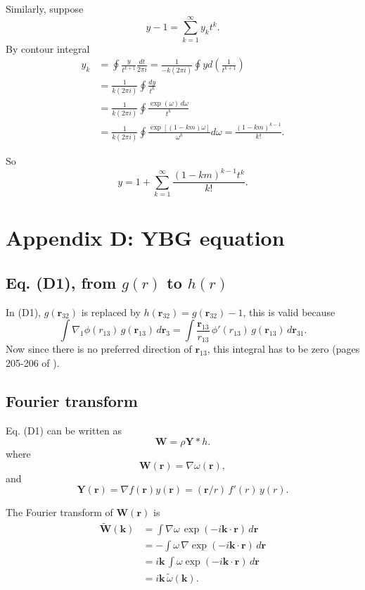 \documentclass[preprint]{revtex4-1}
\numberwithin{equation}{subsection}
\numberwithin{table}{section}
\newcommand{\vct}[1]{\mathbf{#1}}
\providecommand{\vr}{} %
\renewcommand{\vr}{\vct{r}}
\newcommand{\vk}{\vct{k}}
\begin{document}
Similarly, suppose
\[
  y - 1
=
\sum_{k = 1}^\infty y_k t^k.
\]
By contour integral
\begin{align*}
y_k
&=
\oint \frac{y}{t^{k+1}} \frac{dt}{2\pi i}
=
\frac{1}{-k (2\pi i)} \oint y d\left(\frac{1}{t^{k+1}}\right)
\\
&=
\frac{1}{k (2\pi i)} \oint \frac{ dy }{t^{k}}
\\
&=
\frac{1}{k (2\pi i)} \oint \frac{ \exp(\omega) \, d\omega }{t^{k}}
\\
&=
\frac{1}{k (2\pi i)} \oint \frac{ \exp[(1 - k m) \omega]  }{\omega^{k}} d\omega
=
\frac{ (1-k m)^{k-1} }
     { k! }.
\end{align*}

So
\[
  y
=
1 + \sum_{k = 1}^\infty
\frac{ (1 - k m)^{k-1} t^k } { k! }.
\]



\section{Appendix D: YBG equation}

\subsection{Eq. (D1), from $g(r)$ to $h(r)$}

In (D1), $g(\vr_{32})$ is replaced by $h(\vr_{32}) = g(\vr_{32}) - 1$,
this is valid because
\[
  \int \nabla_1 \phi(r_{13}) \, g(\vr_{13}) \, d\vr_3
=
  \int \frac{ \vr_{13} } { r_{13} } \,
  \phi'(r_{13}) \, g(\vr_{13}) \, d\vr_{31}.
\]
Now since there is no preferred direction of $\vr_{13}$,
this integral has to be zero (pages 205-206 of \cite{hill}).



\subsection{Fourier transform}

Eq. (D1) can be written as
\[
  \vct{W}
=
\rho \vct{Y} * h.
\]
where
\[
  \vct{W}(\vr) = \nabla \omega(\vr),
\]
and
\[
  \vct{Y}(\vr) = \nabla f(\vr) y(\vr)
  = (\vr/r) \, f'(r) \, y(r).
\]

The Fourier transform of $\vct W(\vr)$ is
\begin{align*}
  \tilde{\vct{W}}(\vk)
&=
\int \nabla \omega \, \exp(-i\vk \cdot \vr) \, d\vr
\\
&=
-\int \omega \, \nabla \exp(-i\vk \cdot \vr) \, d\vr
\\
&=
i \vk \, \int \omega \exp(-i\vk \cdot \vr) \, d\vr
\\
&=
i \vk \, \tilde{\omega}(\vk).
\end{align*}
\end{document}
